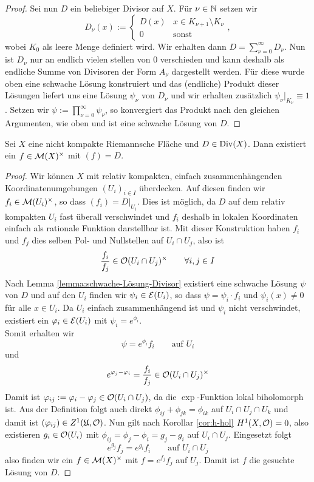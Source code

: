 \begin{proof}
  Sei nun $D$ ein beliebiger Divisor auf $X$. Für $\nu \in \mathbb{N}$
  setzen wir
  \[
  D_\nu(x) := \begin{cases} D(x) & x \in K_{\nu+1}\setminus K_\nu\\ 0
    & \text{sonst}\end{cases}, 
  \]
  wobei $K_0$ als leere Menge definiert wird. Wir erhalten dann $D =
  \sum_{\nu = 0}^\infty D_\nu$. 
  Nun ist $D_\nu$ nur an endlich vielen stellen von 0 verschieden und
  kann deshalb als endliche Summe von Divisoren der Form $A_\nu$
  dargestellt werden. Für diese wurde oben eine schwache Lösung
  konstruiert und das (endliche) Produkt dieser Lösungen liefert uns
  eine Lösung $\psi_\nu$ von $D_\nu$ und wir erhalten zusätzlich $\psi_\nu
  |_{K_\nu} \equiv 1$. 
  Setzen wir $\psi := \prod_{\nu=0}^\infty \psi_\nu$, so
  konvergiert das Produkt nach den gleichen Argumenten, wie oben und
  ist eine schwache Lösung von $D$.
\end{proof}

\begin{thm}
  \label{thm:Lösung-Divisor}
  Sei $X$ eine nicht kompakte Riemannsche Fläche und $D \in
  \operatorname{Div}(X)$. Dann existiert ein $f \in \mathcal{M}(X)^\times$ mit $(f) = D$.
\end{thm}

\begin{proof}
  Wir können $X$ mit relativ kompakten, einfach zusammenhängenden
  Koordinatenumgebungen $(U_i)_{i \in I}$ überdecken. Auf diesen
  finden wir $f_i \in \mathcal{M}(U_i)^\times$, so dass $(f_i) =
  D|_{U_i}$. Dies ist möglich, da $D$ auf dem relativ kompakten $U_i$
  fast überall verschwindet und $f_i$ deshalb in lokalen Koordinaten
  einfach als rationale Funktion darstellbar ist. 
  Mit dieser Konstruktion haben $f_i$ und $f_j$ dies selben Pol- und
  Nullstellen auf $U_i \cap U_j$, also ist
  \[
  \frac{f_i}{f_j} \in \mathcal{O}(U_i \cap U_j)^\times \qquad \forall i,j \in I
  \]
  Nach Lemma \ref{lemma:schwache-Lösung-Divisor} existiert eine
  schwache Lösung $\psi$ von $D$ und auf den $U_i$ finden wir $\psi_i
  \in \mathcal{E}(U_i)$, so dass $\psi = \psi_i \cdot f_i$ und $\psi_i(x)
  \neq 0$ für alle $x \in U_i$. 
  Da $U_i$ einfach zusammenhängend ist und $\psi_i$ nicht
  verschwindet, existiert ein $\varphi_i \in \mathcal{E}(U_i)$ mit $\psi_i =
  e^{\phi_i}$. \\
  Somit erhalten wir
  \[
  \psi = e^{\phi_i} f_i \qquad \text{auf } U_i
  \]
  und
  \[
  e^{\varphi_j - \varphi_i} = \frac{f_i}{f_j} \in \mathcal{O}(U_i \cap U_j)^\times
  \]
  Damit ist $\varphi_{ij} := \varphi_i - \varphi_j \in \mathcal{O}(U_i \cap U_j)$, da
  die $\exp$-Funktion lokal biholomorph ist. Aus der Definition folgt
  auch direkt $\phi_{ij} + \phi_{jk} = \phi_{ik}$ auf $U_i \cap U_j
  \cap U_k$ und damit ist $(\varphi_{ij}) \in Z^1(\mathfrak{U}, \mathcal{O})$. 
  Nun gilt nach Korollar \ref{cor:h-hol} $H^1(X, \mathcal{O}) = 0$, also existieren $g_i \in \mathcal{O}(U_i)$ mit
  $\phi_{ij} = \phi_j - \phi_i = g_j - g_i$ auf $U_i \cap U_j$.
  Eingesetzt folgt
  \[
  e^{g_j} f_j = e^{g_i} f_i \qquad \text{auf } U_i \cap U_j
  \]
  also finden wir ein $f \in \mathcal{M}(X)^\times$ mit $f = e^{f_j} f_j$ auf
  $U_j$. Damit ist $f$ die gesuchte Lösung von $D$.
\end{proof}

